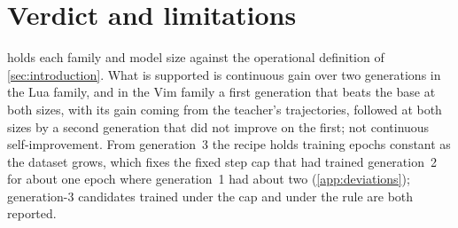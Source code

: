 \section{Verdict and limitations}\label{sec:limitations}

 holds each family and model size against the operational definition of \cref{sec:introduction}. What is
supported is continuous gain over two generations in the Lua family, and in the Vim family a first generation that beats the
base at both sizes, with its gain coming from the teacher's trajectories, followed at both sizes by a second generation that did
not improve on the first; not continuous self-improvement. From generation~3 the recipe holds training epochs constant as the dataset grows, which fixes the fixed step cap that
had trained generation~2 for about one epoch where generation~1 had about two (\cref{app:deviations}); generation-3 candidates
trained under the cap and under the rule are both reported.

